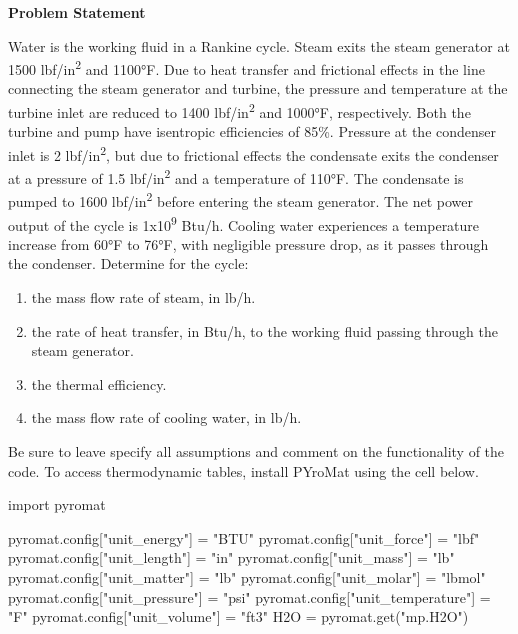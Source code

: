 \textbf{Problem Statement}

Water is the working fluid in a Rankine cycle. Steam exits the steam generator at 1500 
lbf/in\textsuperscript{2}  and 1100°F. Due to heat transfer and frictional effects in 
the line connecting the steam generator and turbine, the pressure and temperature at the 
turbine inlet are reduced to 1400 lbf/in\textsuperscript{2} and 1000°F, respectively. Both the 
turbine and pump have isentropic efficiencies of 85\%. Pressure at the condenser inlet 
is 2 lbf/in\textsuperscript{2}, but due to frictional effects the condensate exits the 
condenser at a pressure of 1.5 lbf/in\textsuperscript{2} and a temperature of 110°F. The 
condensate is pumped to 1600 lbf/in\textsuperscript{2} before entering the steam generator. 
The net power output of the cycle is 1x10\textsuperscript{9} Btu/h. Cooling water experiences 
a temperature increase from 60°F to 76°F, with negligible pressure drop, as it passes 
through the condenser. Determine for the cycle:

\begin{enumerate}
    \item the mass flow rate of steam, in lb/h.
    \item the rate of heat transfer, in Btu/h, to the working fluid passing through the steam 
    generator. 
    \item the thermal efficiency.
    \item the mass flow rate of cooling water, in lb/h.
\end{enumerate}

Be sure to leave specify all assumptions and comment on the functionality of the code. 
To access thermodynamic tables, install PYroMat using the cell below.

\tcblower

\begin{python}
    import pyromat

    pyromat.config["unit_energy"] = "BTU"
    pyromat.config["unit_force"] = "lbf"
    pyromat.config["unit_length"] = "in"
    pyromat.config["unit_mass"] = "lb"
    pyromat.config["unit_matter"] = "lb"
    pyromat.config["unit_molar"] = "lbmol"
    pyromat.config["unit_pressure"] = "psi"
    pyromat.config["unit_temperature"] = "F"
    pyromat.config["unit_volume"] = "ft3"
    H2O = pyromat.get("mp.H2O")
\end{python}
